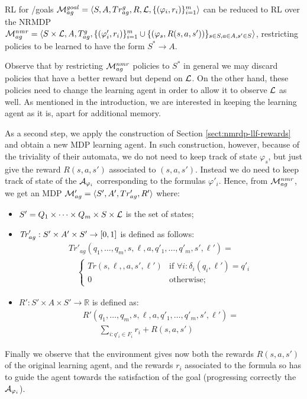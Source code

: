 \begin{theorem}\label{th:goal-nmr}
	RL for \LTLf /\LDLf goals
	$\mathcal{M}_{ag}^{goal}= \langle S, A, Tr^{g}_{ag}, R, \mathcal{L},
	\{(\varphi_i,r_i)\}_{i=1}^{m}\rangle$ can be reduced to RL over the
	NRMDP
	$\mathcal{M}_{ag}^{nmr} = \langle S\times \mathcal{L}, A, T_{ag}^{g},
	\{(\varphi'_i,r_i)\}_{i=1}^{m}\cup \{(\varphi_s, R(s,a, s'))\}_{s\in S,
		a\in A, s'\in S} \rangle$, 
	restricting policies to be learned to have the form $S^*\rightarrow A$.
\end{theorem}

Observe that by restricting $\mathcal{M}_{ag}^{nmr}$ policies to $S^*$ in general we may discard policies that have a better reward but depend on $\mathcal{L}$. On the other hand, these policies need to change the learning agent in order to allow it to observe $\mathcal{L}$ as well. As mentioned in the introduction, we are interested in keeping the learning agent as it is, apart for additional memory.

\medskip
As a second step, we apply the construction of Section \ref{sect:nmrdp-llf-rewards} and obtain a
new MDP learning agent.  In such construction, however, because of the
triviality of their automata, we do not need to keep track of state
$\varphi_s$, but just give the reward $R(s,a,s')$ associated to
$(s,a,s')$. Instead we do need to keep track of state of the \DFAs
$\mathcal{A}_{\varphi_i}$ corresponding to the formulas $\varphi'_i$.
Hence, from $\mathcal{M}_{ag}^{nmr}$, we get an MDP $\mathcal{M}_{ag}'=\langle S',A',Tr'_{ag},R'\rangle$ where:
\begin{itemize}\itemsep=0mm
	\item $S'=Q_1\times\cdots\times Q_m\times S\times \mathcal{L}$ is the set of states;
	\item $\mathit{Tr}'_{ag} : S'\times A' \times S'\rightarrow [0,1]$ is defined as follows:
	\[
	\begin{array}{l}
	Tr'_{ag}(q_1,\ldots,q_m, s,\ell, a, q'_1,\ldots,q'_m, s',\ell') = {}\\
	\quad\left\{
	\begin{array}{ll}
	Tr(s,\ell,,a,s',\ell') &\mbox{if } \forall i:\delta_i(q_i,\ell') = q'_i\\
	0 & \mbox{otherwise}; 
	\end{array}\right.
	\end{array}
	\] 
	\item $R': S'\times A \times S' \rightarrow 
	\mathbb{R}$ is defined as:
	\[\begin{array}{l}
	R'(q_1,\ldots,q_m, s,\ell, a, q'_1,\ldots,q'_m, s',\ell') = {}\\
	\qquad
	\sum_{i: q'_i\in F_i} r_i+R(s,a,s')
	\end{array}
	\] 
\end{itemize}
Finally we observe that the environment gives now both the rewards $R(s,a,s')$ of the original learning agent, and the rewards $r_i$ associated to the formula so has to guide the agent towards the satisfaction of the goal (progressing correctly the \DFAs $\mathcal{A}_{\varphi_i}$).


